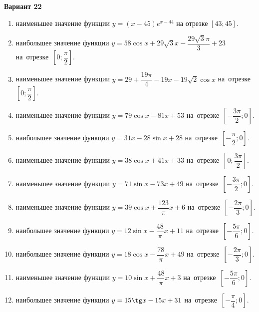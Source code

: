 \documentclass[a4paper,10pt]{article}
\begin{document}
\begin{center}\Large\textbf{Вариант 22}\end{center}

\begin{enumerate}
\item {} наименьшее значение функции $y = \left(x-45\right)e^{x-44}$ на отрезке $\left[43;45\right]$.

\item {} наибольшее значение функции $y = 58\cos x+29\sqrt{3}x-\dfrac{29\sqrt{3}\pi}{3} +23$ на~отрезке~$\left[0;\dfrac{\pi }{2}\right]$.

\item {} наименьшее значение функции $y = 29+\dfrac{19 \pi}{4}-19x-19\sqrt{2}\cos x$ на~отрезке~$\left[0;\dfrac{\pi }{2}\right]$.

\item {} наименьшее значение функции $y = 79\cos x-81x+53$ на~отрезке~$\left[-\dfrac{3\pi }{2};0\right]$.

\item {} наибольшее значение функции $y = 31x-28\sin x+28$ на~отрезке~$\left[-\dfrac{\pi }{2};0\right]$.

\item {} наименьшее значение функции $y = 38\cos x+41x+33$ на~отрезке~$\left[0;\dfrac{3\pi }{2}\right]$.

\item {} наименьшее значение функции $y = 71\sin x-73x+49$ на~отрезке~$\left[-\dfrac{3\pi }{2};0\right]$.

\item {} наименьшее значение функции $y = 39\cos x+\dfrac{123}{\pi }x +6$ на~отрезке~$\left[-\dfrac{2\pi }{3};0\right]$.

\item {} наибольшее значение функции $y = 12\sin x-\dfrac{48}{\pi }x+11$ на~отрезке~$\left[-\dfrac{5\pi }{6};0\right]$.

\item {} наибольшее значение функции $y = 18\cos x-\dfrac{78}{\pi }x+49$ на~отрезке~$\left[-\dfrac{2\pi }{3};0\right]$.

\item {} наименьшее значение функции $y = 10\sin x+\dfrac{48}{\pi }x+3$ на~отрезке~$\left[-\dfrac{5\pi }{6};0\right]$.

\item {} наибольшее значение функции $y = 15\tg x-15x+31$ на~отрезке~$\left[-\dfrac{\pi }{4};0\right]$.


\end{enumerate}
\end{document}

